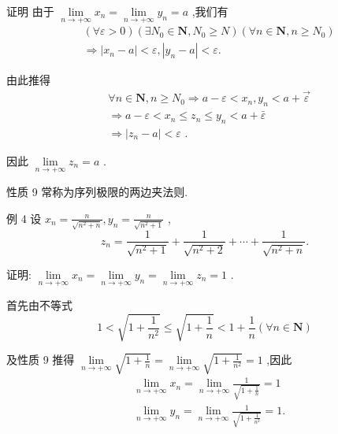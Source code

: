 证明 由于 $\mathop{\lim }\limits_{{n \rightarrow   + \infty }}{x}_{n} = \mathop{\lim }\limits_{{n \rightarrow   + \infty }}{y}_{n} = a$ ,我们有
\begin{align*}
	&\left( {\forall \varepsilon  > 0}\right) \left( {\exists {N}_{0} \in  \mathbf{N},{N}_{0} \geq  N}\right) \left( {\forall n \in  \mathbf{N},n \geq  {N}_{0}}\right)\\
	&\Rightarrow  \left| {{x}_{n} - a}\right|  < \varepsilon ,\left| {{y}_{n} - a}\right|  < \varepsilon .
\end{align*}

由此推得
\begin{align*}
	&\forall n \in  \mathbf{N},n \geq  {N}_{0} \Rightarrow  a - \varepsilon  < {x}_{n},{y}_{n} < a + \overrightarrow{\varepsilon }\\
	&\Rightarrow  a - \varepsilon  < {x}_{n} \leq  {z}_{n} \leq  {y}_{n} < a + \bar{\varepsilon }\\
	&\Rightarrow  \left| {{z}_{n} - a}\right|  < \varepsilon \text{ . }
\end{align*}

因此 $\mathop{\lim }\limits_{{n \rightarrow   + \infty }}{z}_{n} = a$ .

性质 9 常称为序列极限的两边夹法则.

例 4 设 ${x}_{n} = \frac{n}{\sqrt{{n}^{2} + n}},{y}_{n} = \frac{n}{\sqrt{{n}^{2} + 1}}$ ,
$${z}_{n} = \frac{1}{\sqrt{{n}^{2} + 1}} + \frac{1}{\sqrt{{n}^{2} + 2}} + \cdots  + \frac{1}{\sqrt{{n}^{2} + n}}.$$

证明: $\mathop{\lim }\limits_{{n \rightarrow   + \infty }}{x}_{n} = \mathop{\lim }\limits_{{n \rightarrow   + \infty }}{y}_{n} = \mathop{\lim }\limits_{{n \rightarrow   + \infty }}{z}_{n} = 1$ .

首先由不等式
$$1 < \sqrt{1 + \frac{1}{{n}^{2}}} \leq  \sqrt{1 + \frac{1}{n}} < 1 + \frac{1}{n}\left( {\forall n \in  \mathbf{N}}\right)$$

及性质 9 推得 $\mathop{\lim }\limits_{{n \rightarrow   + \infty }}\sqrt{1 + \frac{1}{n}} = \mathop{\lim }\limits_{{n \rightarrow   + \infty }}\sqrt{1 + \frac{1}{{n}^{2}}} = 1$ ,因此
\begin{align*}
	&\mathop{\lim }\limits_{{n \rightarrow   + \infty }}{x}_{n} = \mathop{\lim }\limits_{{n \rightarrow   + \infty }}\frac{1}{\sqrt{1 + \frac{1}{n}}} = 1\\
	&\mathop{\lim }\limits_{{n \rightarrow   + \infty }}{y}_{n} = \mathop{\lim }\limits_{{n \rightarrow   + \infty }}\frac{1}{\sqrt{1 + \frac{1}{{n}^{2}}}} = 1.
\end{align*}

